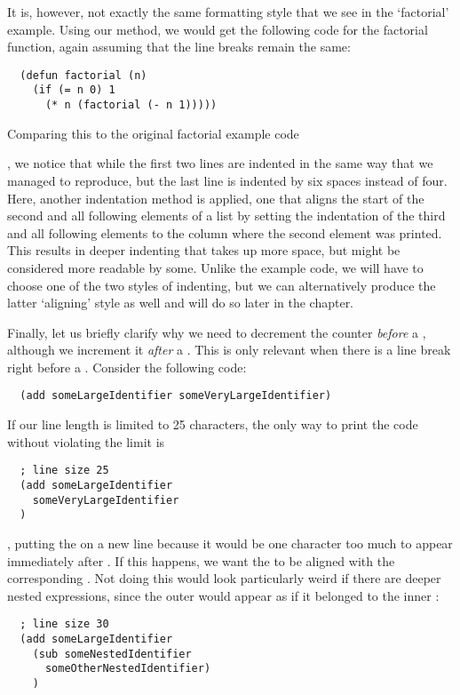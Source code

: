 It is, however, not exactly the same formatting style that we see in the `factorial' example.
Using our method, we would get the following code for the factorial function,
again assuming that the line breaks remain the same:
\begin{verbatim}
  (defun factorial (n)
    (if (= n 0) 1
      (* n (factorial (- n 1)))))
\end{verbatim}
Comparing this to the original factorial example code

, we notice that while the first two lines are indented in the same way that we managed to reproduce,
but the last line is indented by six spaces instead of four.
Here, another indentation method is applied,
one that aligns the start of the second and all following elements of a list
by setting the indentation of the third and all following elements
to the column where the second element was printed.
This results in deeper indenting that takes up more space,
but might be considered more readable by some.
Unlike the example code, we will have to choose one of the two styles of indenting,
but we can alternatively produce the latter `aligning' style as well and will do so later in the chapter.

Finally, let us briefly clarify why we need to decrement the counter \textit{before} a ,
although we increment it \textit{after} a .
This is only relevant when there is a line break right before a .
Consider the following code:
\begin{verbatim}
  (add someLargeIdentifier someVeryLargeIdentifier)
\end{verbatim}
If our line length is limited to 25 characters,
the only way to print the code without violating the limit is
\begin{verbatim}
  ; line size 25
  (add someLargeIdentifier
    someVeryLargeIdentifier
  )
\end{verbatim}
, putting the  on a new line
because it would be one character too much
to appear immediately after .
If this happens, we want the  to be aligned with the corresponding .
Not doing this would look particularly weird if there are deeper nested expressions,
since the outer  would appear as if it belonged to the inner :
\begin{verbatim}
  ; line size 30
  (add someLargeIdentifier
    (sub someNestedIdentifier
      someOtherNestedIdentifier)
    )
\end{verbatim}

